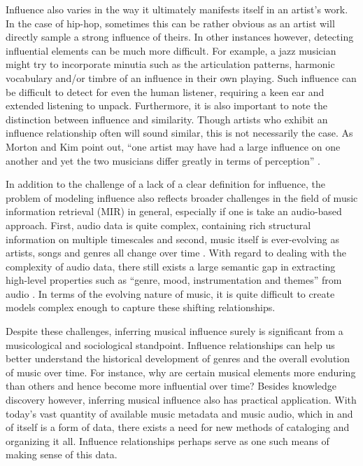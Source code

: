 Influence also varies in the way it ultimately manifests itself in an artist's work. In the case of hip-hop, sometimes this can be rather obvious as an artist will directly sample a strong influence of theirs. In other instances however, detecting influential elements can be much more difficult. For example, a jazz musician might try to incorporate minutia such as the articulation patterns, harmonic vocabulary and/or timbre of an influence in their own playing. Such influence can be difficult to detect for even the human listener, requiring a keen ear and extended listening to unpack. Furthermore, it is also important to note the distinction between influence and similarity. Though artists who exhibit an influence relationship often will sound similar, this is not necessarily the case. As Morton and Kim point out, ``one artist may have had a large influence on one another and yet the two musicians differ greatly in terms of perception'' \cite{morton2015acoustic}. 

In addition to the challenge of a lack of a clear definition for influence, the problem of modeling influence also reflects broader challenges in the field of music information retrieval (MIR) in general, especially if one is take an audio-based approach. First, audio data is quite complex, containing rich structural information on multiple timescales and second, music itself is ever-evolving as artists, songs and genres all change over time \cite{shalit2013modeling}. With regard to dealing with the complexity of audio data, there still exists a large semantic gap in extracting high-level properties such as ``genre, mood, instrumentation and themes'' from audio  \cite{van2013deep}. In terms of the evolving nature of music, it is quite difficult to create models complex enough to capture these shifting relationships.

Despite these challenges, inferring musical influence surely is significant from a musicological and sociological standpoint. Influence relationships can help us better understand the historical development of genres and the overall evolution of music over time. For instance, why are certain musical elements more enduring than others and hence become more influential over time? Besides knowledge discovery however, inferring musical influence also has practical application. With today's vast quantity of available music metadata and music audio, which in and of itself is a form of data, there exists a need for new methods of cataloging and organizing it all. Influence relationships perhaps serve as one such means of making sense of this data.

